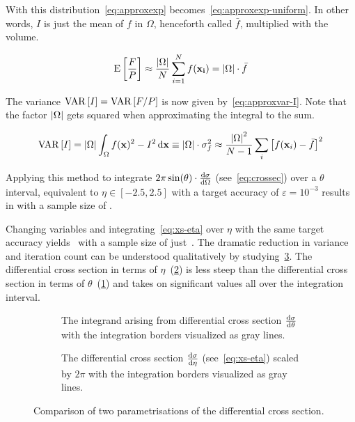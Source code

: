 With this distribution~\eqref{eq:approxexp}
becomes~\eqref{eq:approxexp-uniform}. In other words, \(I\) is just
the mean of \(f\) in \(\Omega\), henceforth
called \(\bar{f}\), multiplied with the volume.

\begin{equation}
  \label{eq:approxexp-uniform}
  \operatorname{E}\qty[\frac{F}{P}] \approx
  \frac{\abs{\Omega}}{N}\sum_{i=1}^N f(\vb{x_i}) = \abs{\Omega}\cdot\bar{f}
\end{equation}

The variance \(\operatorname{VAR}\qty[I]=\operatorname{VAR}\qty[F/P]\) is now given
by~\ref{eq:approxvar-I}. Note that the factor \(\abs{\Omega}\) gets
squared when approximating the integral to the sum.

\begin{equation}
  \label{eq:approxvar-I}
  \operatorname{VAR}\qty[I] = \abs{\Omega}\int_\Omega f(\vb{x})^2 -
  I^2 \dd{\vb{x}} \equiv \abs{\Omega}\cdot\sigma_f^2 \approx
  \frac{\abs{\Omega}^2}{N-1}\sum_{i}\qty[f(\vb{x}_i) - \bar{f}]^2
\end{equation}

Applying this method to integrate
\(2\pi\sin(\theta)\cdot\dv{\sigma}{\Omega}\) (see~\eqref{eq:crossec})
over a \(\theta\) interval, equivalent to \(\eta\in [-2.5, 2.5]\) with
a target accuracy of \(\varepsilon=10^{-3}\) results in
 with a sample size of
.

Changing variables and integrating~\eqref{eq:xs-eta} over \(\eta\)
with the same target accuracy yields~ with
a sample size of just~. The dramatic
reduction in variance and iteration count can be understood
qualitatively by studying~\ref{fig:xs-int-comp}. The differential
cross section in terms of \(\eta\)~(\ref{fig:xs-int-eta}) is less
steep than the differential cross section in terms of
\(\theta\)~(\ref{fig:xs-int-theta}) and takes on significant values
all over the integration interval.

\begin{figure}[ht]
  \centering
  \begin{subfigure}[c]{.49\textwidth}
    \caption[\(2\pi\dv{\sigma}{\theta}\) with integration
    boundaries]{\label{fig:xs-int-theta} The integrand arising from
      differential cross section \(\dv{\sigma}{\theta}\) with the
      integration borders visualized as gray lines.}
  \end{subfigure}
  \begin{subfigure}[c]{.49\textwidth}
    \caption[\(2\pi\dv{\sigma}{\eta}\) with integration
    boundaries]{\label{fig:xs-int-eta} The differential cross section
      \(\dv{\sigma}{\eta}\) (see~\ref{eq:xs-eta}) scaled by \(2\pi\)
      with the integration borders visualized as gray lines.}
  \end{subfigure}
  \caption{\label{fig:xs-int-comp} Comparison of two parametrisations of the differential cross
  section.}
\end{figure}

